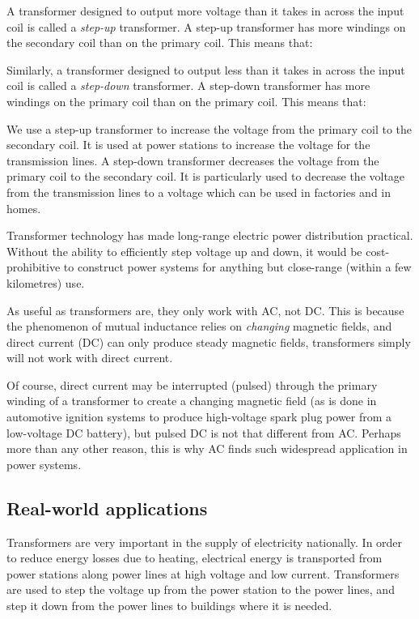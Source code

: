A transformer designed to output more voltage than it takes in
across the input coil is called a \textit{step-up} transformer. A
step-up transformer has more windings on the secondary coil than
on the primary coil. This means that: 
 
Similarly, a transformer designed to output less than it takes in
across the input coil is called a \textit{step-down} transformer.
A step-down transformer has more windings on the primary coil than
on the primary coil. This means that: 
 
We use a step-up transformer to increase the voltage from the primary coil to the secondary coil. It is used at power stations to increase the voltage for the transmission lines.
A step-down transformer decreases the voltage from the primary coil to the secondary coil. It is particularly used to decrease the voltage from the transmission lines to a voltage which can be used in factories and in homes.
 
Transformer technology has made long-range electric power
distribution practical. Without the ability to efficiently step
voltage up and down, it would be cost-prohibitive to construct
power systems for anything but close-range (within a few kilometres) use.
 
As useful as transformers are, they only work with AC,
not DC. This is because the phenomenon of mutual inductance relies on
\textit{changing} magnetic fields, and direct current (DC) can
only produce steady magnetic fields, transformers simply will not
work with direct current.
 
Of course, direct current may be
interrupted (pulsed) through the primary winding of a transformer
to create a changing magnetic field (as is done in automotive
ignition systems to produce high-voltage spark plug power from a
low-voltage DC battery), but pulsed DC is not that different from
AC. Perhaps more than any other reason, this is why AC finds such
widespread application in power systems.

\subsection{Real-world applications}
Transformers are very important in the supply of electricity
nationally. In order to reduce energy losses due to heating,
electrical energy is transported from power stations along power
lines at high voltage and low current.  Transformers are used to
step the voltage up from the power station to the power lines, and
step it down from the power lines to buildings where it is needed.



